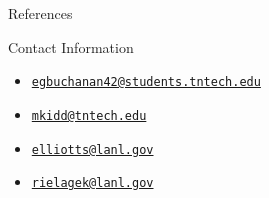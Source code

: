 \documentclass[final]{beamer}
\newlength{\onecolwid}
\begin{document}
\begin{frame}[t]
\begin{columns}[t]
\begin{column}{\onecolwid}

\begin{block}{References}

\nocite{*} %
\small{
\vspace{0.75in}}

\end{block}


\begin{alertblock}{Contact Information}

\begin{itemize}
\item \href{mailto:egbuchanan42@students.tntech.edu}{\texttt{egbuchanan42@students.tntech.edu}}
\item \href{mailto:mkidd@tntech.edu}{\texttt{mkidd@tntech.edu}}
\item \href{mailto:elliotts@lanl.gov}{\texttt{elliotts@lanl.gov}}
\item \href{mailto:rielagek@lanl.gov}{\texttt{rielagek@lanl.gov}}
\end{itemize}

\end{alertblock}


\end{column} %

\end{columns} %

\end{frame} %
\end{document}
